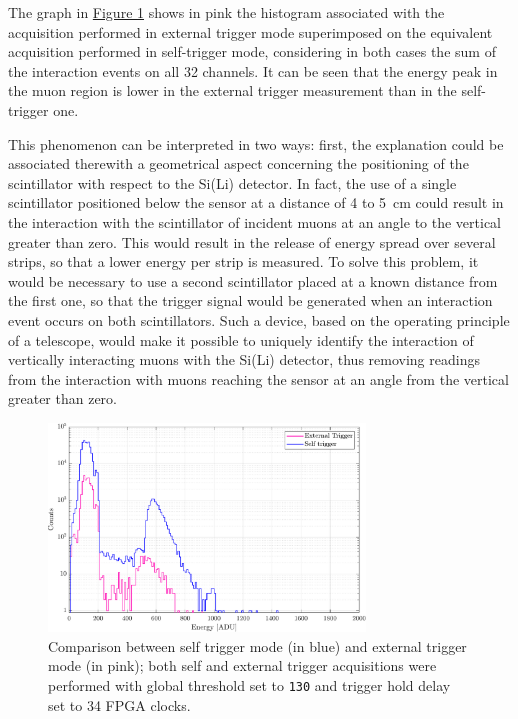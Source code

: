 \par
The graph in \hyperref[figMUONselfExtComparativa]{Figure \ref{figMUONselfExtComparativa}} shows in pink the histogram associated with the acquisition performed in external trigger mode superimposed on the equivalent acquisition performed in self-trigger mode, considering in both cases the sum of the interaction events on all 32 channels. It can be seen that the energy peak in the muon region is lower in the external trigger measurement than in the self-trigger one.

\par
This phenomenon can be interpreted in two ways: first, the explanation could be associated therewith a geometrical aspect concerning the positioning of the scintillator with respect to the Si(Li) detector. In fact, the use of a single scintillator positioned below the sensor at a distance of  4 to \SI{5}{\cm} could result in the interaction with the scintillator of incident muons at an angle to the vertical greater than zero. This would result in the release of energy spread over several strips, so that a lower energy per strip is measured. To solve this problem, it would be necessary to use a second scintillator placed at a known distance from the first one, so that the trigger signal would be generated when an interaction event occurs on both scintillators. Such a device, based on the operating principle of a telescope, would make it possible to uniquely identify the interaction of vertically interacting muons with the Si(Li) detector, thus removing readings from the interaction with muons reaching the sensor at an angle from the vertical greater than zero.

\begin{figure}[h!]
    \centering
    \includegraphics[width=0.75\textwidth]{Images/chap3/results/muons/incoming_energy_external34_self_100.pdf}
    \caption{Comparison between self trigger mode (in blue) and external trigger mode (in pink); both self and external trigger acquisitions were performed with global threshold set to \texttt{130} and trigger hold delay set to 34 FPGA clocks.}
    \label{figMUONselfExtComparativa}
\end{figure}

